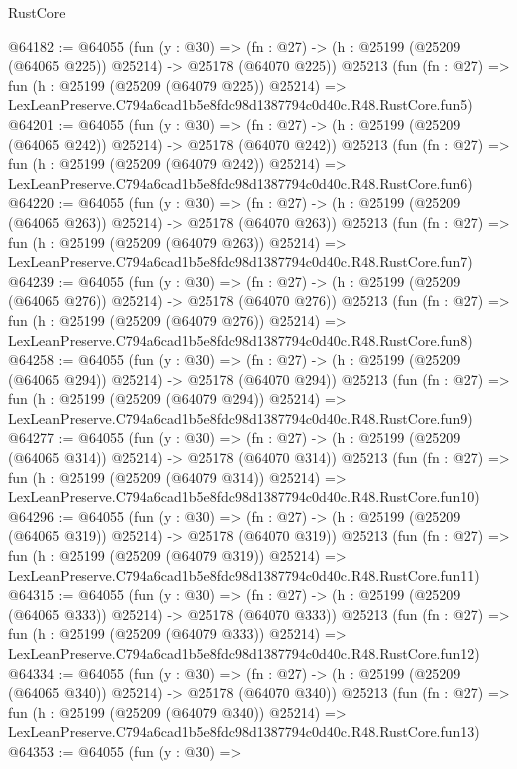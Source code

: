 \begin{lexlean}{RustCore}
\begin{coremodule}
@64182 := @64055
    (fun (y : @30) =>
    (fn : @27) -> (h : @25199 (@25209 (@64065 @225)) @25214) -> @25178 (@64070 @225))
    @25213
    (fun (fn : @27) =>
    fun (h : @25199 (@25209 (@64079 @225)) @25214) =>
    LexLeanPreserve.C794a6cad1b5e8fdc98d1387794c0d40c.R48.RustCore.fun5)
@64201 := @64055
    (fun (y : @30) =>
    (fn : @27) -> (h : @25199 (@25209 (@64065 @242)) @25214) -> @25178 (@64070 @242))
    @25213
    (fun (fn : @27) =>
    fun (h : @25199 (@25209 (@64079 @242)) @25214) =>
    LexLeanPreserve.C794a6cad1b5e8fdc98d1387794c0d40c.R48.RustCore.fun6)
@64220 := @64055
    (fun (y : @30) =>
    (fn : @27) -> (h : @25199 (@25209 (@64065 @263)) @25214) -> @25178 (@64070 @263))
    @25213
    (fun (fn : @27) =>
    fun (h : @25199 (@25209 (@64079 @263)) @25214) =>
    LexLeanPreserve.C794a6cad1b5e8fdc98d1387794c0d40c.R48.RustCore.fun7)
@64239 := @64055
    (fun (y : @30) =>
    (fn : @27) -> (h : @25199 (@25209 (@64065 @276)) @25214) -> @25178 (@64070 @276))
    @25213
    (fun (fn : @27) =>
    fun (h : @25199 (@25209 (@64079 @276)) @25214) =>
    LexLeanPreserve.C794a6cad1b5e8fdc98d1387794c0d40c.R48.RustCore.fun8)
@64258 := @64055
    (fun (y : @30) =>
    (fn : @27) -> (h : @25199 (@25209 (@64065 @294)) @25214) -> @25178 (@64070 @294))
    @25213
    (fun (fn : @27) =>
    fun (h : @25199 (@25209 (@64079 @294)) @25214) =>
    LexLeanPreserve.C794a6cad1b5e8fdc98d1387794c0d40c.R48.RustCore.fun9)
@64277 := @64055
    (fun (y : @30) =>
    (fn : @27) -> (h : @25199 (@25209 (@64065 @314)) @25214) -> @25178 (@64070 @314))
    @25213
    (fun (fn : @27) =>
    fun (h : @25199 (@25209 (@64079 @314)) @25214) =>
    LexLeanPreserve.C794a6cad1b5e8fdc98d1387794c0d40c.R48.RustCore.fun10)
@64296 := @64055
    (fun (y : @30) =>
    (fn : @27) -> (h : @25199 (@25209 (@64065 @319)) @25214) -> @25178 (@64070 @319))
    @25213
    (fun (fn : @27) =>
    fun (h : @25199 (@25209 (@64079 @319)) @25214) =>
    LexLeanPreserve.C794a6cad1b5e8fdc98d1387794c0d40c.R48.RustCore.fun11)
@64315 := @64055
    (fun (y : @30) =>
    (fn : @27) -> (h : @25199 (@25209 (@64065 @333)) @25214) -> @25178 (@64070 @333))
    @25213
    (fun (fn : @27) =>
    fun (h : @25199 (@25209 (@64079 @333)) @25214) =>
    LexLeanPreserve.C794a6cad1b5e8fdc98d1387794c0d40c.R48.RustCore.fun12)
@64334 := @64055
    (fun (y : @30) =>
    (fn : @27) -> (h : @25199 (@25209 (@64065 @340)) @25214) -> @25178 (@64070 @340))
    @25213
    (fun (fn : @27) =>
    fun (h : @25199 (@25209 (@64079 @340)) @25214) =>
    LexLeanPreserve.C794a6cad1b5e8fdc98d1387794c0d40c.R48.RustCore.fun13)
@64353 := @64055
    (fun (y : @30) =>

\end{coremodule}
\end{lexlean}
